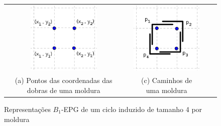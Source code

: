 \begin{figure}[htb]
  \centering
  \begin{tabular}{c c c c c }
    \includegraphics[width=3.5cm]{./img/dispositionFrameInGrid.png}    
    & &
 \includegraphics[width=3.5cm]{./img/frameInGrid.png} \\%
    {\footnotesize (a) Pontos das coordenadas das dobras de uma moldura}  
    & & {\footnotesize (c) Caminhos de uma moldura} %
  \end{tabular}
  \caption{Representações $B_{1}$-EPG de um ciclo induzido de tamanho 4 por moldura} \label{fig:frameInGrid}
\end{figure} 
